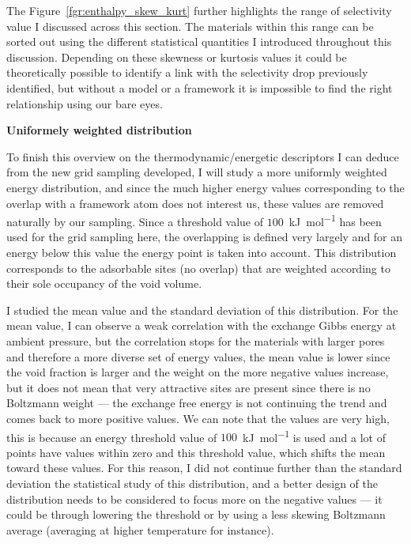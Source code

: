 \documentclass[main]{subfiles}
\begin{document}
The Figure~\ref{fgr:enthalpy_skew_kurt} further highlights the range of selectivity value I discussed across this section. The materials within this range can be sorted out using the different statistical quantities I introduced throughout this discussion. Depending on these skewness or kurtosis values it could be theoretically possible to identify a link with the selectivity drop previously identified, but without a model or a framework it is impossible to find the right relationship using our bare eyes.

\textbf{Uniformely weighted distribution}

To finish this overview on the thermodynamic/energetic descriptors I can deduce from the new grid sampling developed, I will study a more uniformly weighted energy distribution, and since the much higher energy values corresponding to the overlap with a framework atom does not interest us, these values are removed naturally by our sampling. Since a threshold value of $100$~\si{\kilo\joule\per\mole} has been used for the grid sampling here, the overlapping is defined very largely and for an energy below this value the energy point is taken into account. This distribution corresponds to the adsorbable sites (no overlap) that are weighted according to their sole occupancy of the void volume. 

I studied the mean value and the standard deviation of this distribution. For the mean value, I can observe a weak correlation with the exchange Gibbs energy at ambient pressure, but the correlation stops for the materials with larger pores and therefore a more diverse set of energy values, the mean value is lower since the void fraction is larger and the weight on the more negative values increase, but it does not mean that very attractive sites are present since there is no Boltzmann weight --- the exchange free energy is not continuing the trend and comes back to more positive values. We can note that the values are very high, this is because an energy threshold value of $100$~\si{\kilo\joule\per\mole} is used and a lot of points have values within zero and this threshold value, which shifts the mean toward these values. For this reason, I did not continue further than the standard deviation the statistical study of this distribution, and a better design of the distribution needs to be considered to focus more on the negative values --- it could be through lowering the threshold or by using a less skewing Boltzmann average (averaging at higher temperature for instance).
\end{document}
